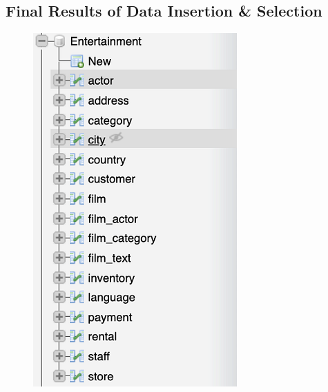 \documentclass[openany]{article}
\begin{document}
\subsection{Final Results of Data Insertion \& Selection}
	\begin{figure}[H]
		\includegraphics[width=\textwidth, height=\textheight, keepaspectratio]{data_insertion_selection}
	\end{figure}	
\end{document}
